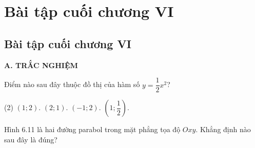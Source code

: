%

\section*{Bài tập cuối chương VI}

\begin{exercises}
    \subsection{Bài tập cuối chương VI}

    \textbf{A. TRẮC NGHIỆM}

    \begin{questions}[resume=SGK]
        \item Điểm nào sau đây thuộc đồ thị của hàm số $y=\dfrac{1}{2}x^2$?
        \begin{tasks}(2)
            \task[(A)] $(1;2)$.
            \task[(B)] $(2;1)$.
            \task[(C)] $(-1;2)$.
            \task[(D)] $\left(1;\dfrac{1}{2}\right)$.
        \end{tasks}
        \par\noindent\answerbox\par

        \item Hình 6.11 là hai đường parabol trong mặt phẳng tọa độ $Oxy$. Khẳng định nào sau đây là đúng?

        \begin{center}
\end{center}
\end{questions}
\end{exercises}
